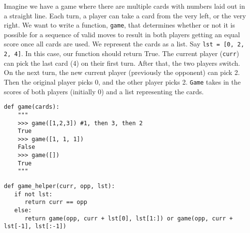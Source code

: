 \begin{blocksection}
\question Imagine we have a game where there are multiple cards with numbers laid out in a straight line. 
Each turn, a player can take a card from the very left, or the very right. 
\newline
We want to write a function, \texttt{game}, that determines whether or not it is possible for a sequence of valid 
moves to result in both players getting an equal score once all cards are used.
\newline
We represent the cards as a list. Say \texttt{lst = [0, 2, 2, 4]}. In this case, our function should return True. 
The current player (\texttt{curr}) can pick the last card (4) on their first turn. After that, the two players switch. 
On the next turn, the new current player (previously the opponent) can pick 2. Then the original player picks 0, 
and the other player picks 2.
\newline
\texttt{Game} takes in the scores of both players (initially 0) and a list representing the cards.
\newline
\begin{lstlisting}
def game(cards):
    """
    >>> game([1,2,3]) #1, then 3, then 2
    True
    >>> game([1, 1, 1])
    False
    >>> game([])
    True
    """
\end{lstlisting}
\begin{solution}
\begin{lstlisting}
def game_helper(curr, opp, lst):
   if not lst:
      return curr == opp
   else:
      return game(opp, curr + lst[0], lst[1:]) or game(opp, curr + lst[-1], lst[:-1])
\end{lstlisting}
\end{solution}
\end{blocksection}
